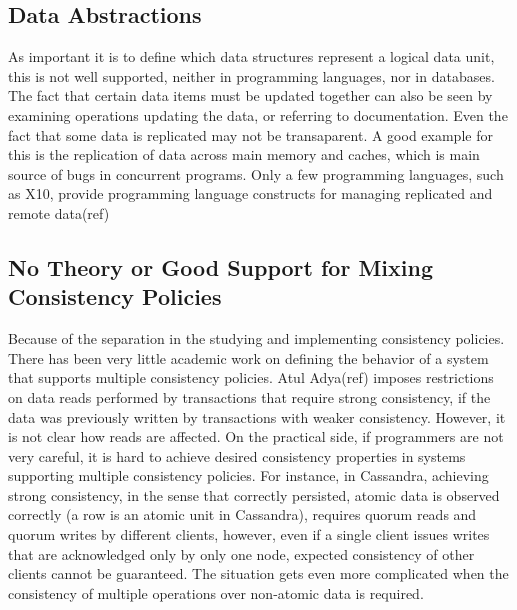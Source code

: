 \subsection{Data Abstractions}
As important it is to define which data structures represent a logical data
unit, this is not well supported, neither in programming languages, nor in
databases. The fact that certain data items must be updated together can also be
seen by examining operations updating the data, or referring to documentation.
Even the fact that some data is replicated may not be transaparent. A good
example for this is the replication of data across main memory and caches, which
is main source of bugs in concurrent programs. Only a few programming languages,
such as X10, provide programming language constructs for managing replicated and
remote data(ref)




\subsection{No Theory or Good Support for Mixing Consistency Policies}

Because of the separation in the studying and implementing consistency policies.
There has been very little academic work on defining the behavior of a system
that supports multiple consistency policies. Atul Adya(ref) imposes restrictions
on data reads performed by transactions that require strong consistency, if the data was
previously written by transactions with weaker consistency. However, it is not clear
how reads are affected. On the practical side, if programmers are not very
careful, it is hard to achieve desired consistency properties in systems
supporting multiple consistency policies. For instance, in Cassandra, achieving
strong consistency, in the sense that correctly persisted, atomic data is
observed correctly (a row is an atomic unit in Cassandra), requires quorum reads
and quorum writes by different clients, however, even if a single client issues
writes that are acknowledged only by only one node, expected consistency of
other clients cannot be guaranteed. The situation gets even more complicated
when the consistency of multiple operations over non-atomic data is required.

